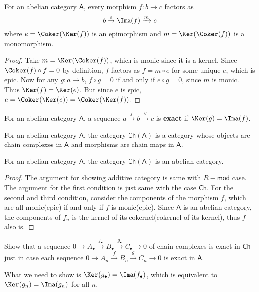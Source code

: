 \begin{prop} For an abelian category $\mathsf{A}$, every morphism $f:b\rightarrow c$ factors as
\begin{equation}
b\xrightarrow{e}\Ima(f)\xrightarrow{m} c
\end{equation}
where $e=\Coker(\Ker(f))$ is an epimorphism and $m=\Ker(\Coker(f))$ is a monomorphism.
\end{prop}
\begin{proof}
Take $m=\Ker(\Coker(f))$, which is monic since it is a kernel. Since $\Coker(f)\circ f=0$ by definition, $f$ factors as $f=m\circ e$ for some unique $e$, which is epic. Now for any $g:a\rightarrow b$, $f\circ g=0$ if and only if $e\circ g=0$, since $m$ is monic. Thus $\Ker(f)=\Ker(e)$. But since $e$ is epic, $e=\Coker(\Ker(e))=\Coker(\Ker(f))$.
\end{proof}

\begin{defn} For an abelian category $\mathsf{A}$, a sequence $a\xrightarrow{f} b\xrightarrow{g} c$ is \textbf{exact} if $\Ker(g)=\Ima(f)$.
\end{defn}

\begin{defn} For an abelian category $\mathsf{A}$, the category $\mathsf{Ch}(\mathsf{A})$ is a category whose objects are chain complexes in $\mathsf{A}$ and morphisms are chain maps in $\mathsf{A}$.
\end{defn}

\begin{thm} For an abelian category $\mathsf{A}$, the category $\mathsf{Ch}(\mathsf{A})$ is an abelian category.
\end{thm}
\begin{proof}
The argument for showing additive category is same with $R-\mathsf{mod}$ case. The argument for the first condition is just same with the case $\mathsf{Ch}$. For the second and third condition, consider the components of the morphism $f$, which are all monic(epic) if and only if $f$ is monic(epic). Since $\mathsf{A}$ is an abelian category, the components of $f_n$ is the kernel of its cokernel(cokernel of its kernel), thus $f$ also is.
\end{proof}

\begin{exer} Show that a sequence $0\rightarrow A_\bullet\xrightarrow{f_\bullet} B_\bullet \xrightarrow{g_\bullet} C_\bullet\rightarrow 0$ of chain complexes is exact in $\mathsf{Ch}$ just in case each sequence $0\rightarrow A_n\xrightarrow{f} B_n\xrightarrow{g} C_n\rightarrow 0$ is exact in $\mathsf{A}$.
\end{exer}
\begin{solution} What we need to show is $\Ker(g_\bullet)=\Ima(f_\bullet)$, which is equivalent to $\Ker(g_n)=\Ima(g_n)$ for all $n$.
\end{solution}

